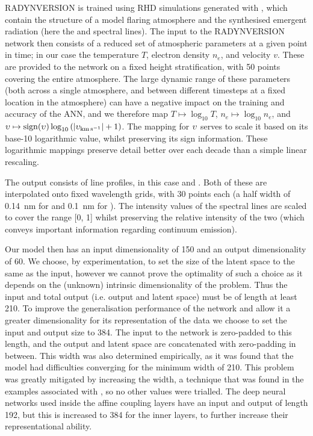 RADYNVERSION is trained using RHD simulations generated with \Radyn{}, which contain the structure of a model flaring atmosphere and the synthesised emergent radiation (here the \Ha{} and \CaLine{} spectral lines).
The input to the RADYNVERSION network then consists of a reduced set of atmospheric parameters at a given point in time; in our case the temperature $T$, electron density $n_e$, and velocity $v$.
These are provided to the network on a fixed height stratification, with 50 points covering the entire atmosphere.
The large dynamic range of these parameters (both across a single atmosphere, and between different timesteps at a fixed location in the atmosphere) can have a negative impact on the training and accuracy of the ANN, and we therefore map $T\mapsto\log_{10} T$, $n_e\mapsto\log_{10} n_e$, and $\upsilon\mapsto\mathrm{sign}(\upsilon)\log_{10} \left( |\upsilon_{\mathrm{km\, s^{-1}}}| + 1\right)$.
The mapping for $\upsilon$ serves to scale it based on its base-10 logarithmic value, whilst preserving its sign information.
These logarithmic mappings preserve detail better over each decade than a simple linear rescaling.

The output consists of line profiles, in this case \Ha{} and \CaLine{}.
Both of these are interpolated onto fixed wavelength grids, with 30 points each (a half width of \SI{0.14}{\nano\metre} for \Ha{} and \SI{0.1}{\nano\metre} for \CaLine{}).
The intensity values of the spectral lines are scaled to cover the range [0, 1] whilst preserving the relative intensity of the two (which conveys important information regarding continuum emission).

Our model then has an input dimensionality of 150 and an output dimensionality of 60.
We choose, by experimentation, to set the size of the latent space to the same as the input, however we cannot prove the optimality of such a choice as it depends on the (unknown) intrinsic dimensionality of the problem.
Thus the input and total output (i.e. output and latent space) must be of length at least 210.
To improve the generalisation performance of the network and allow it a greater dimensionality for its representation of the data we choose to set the input and output size to 384.
The input to the network is zero-padded to this length, and the output and latent space are concatenated with zero-padding in between.
This width was also determined empirically, as it was found that the model had difficulties converging for the minimum width of 210.
This problem was greatly mitigated by increasing the width, a technique that was found in the examples associated with \citep{2018Ardizzone}, so no other values were trialled.
The deep neural networks used inside the affine coupling layers have an input and output of length 192, but this is increased to 384 for the inner layers, to further increase their representational ability.

